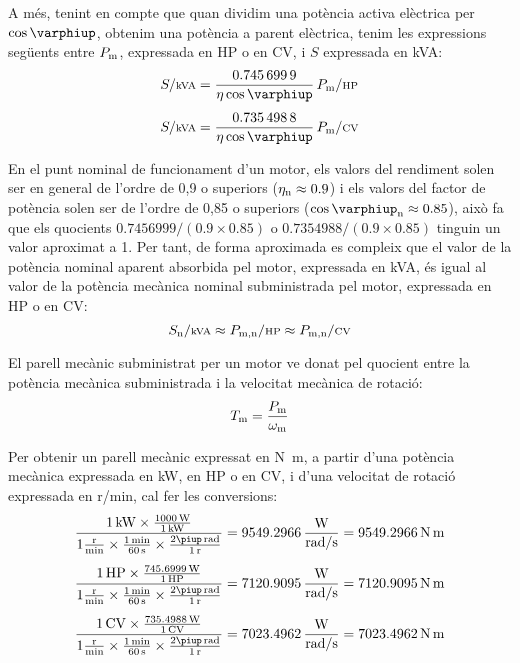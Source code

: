  A més, tenint en compte que quan dividim una potència activa elèctrica per $\cos\varphiup$, obtenim una potència a parent elèctrica, tenim les expressions següents entre $P\ped{m}$, expressada en HP o en CV, i $S$ expressada en kVA:
\begin{align}
    S/{\scriptstyle\si{kVA}} &= \frac{\num{0,7456999}}{\eta \cos\varphiup}\,   P\ped{m}/{\scriptstyle\si{HP}} \\[1ex]
    S/{\scriptstyle\si{kVA}} &= \frac{\num{0,7354988}}{\eta \cos\varphiup}\,   P\ped{m}/{\scriptstyle\si{CV}}
\end{align}

En el punt nominal de funcionament d'un motor, els valors del rendiment solen ser en general de l'ordre de 0,9 o superiors ($\eta\ped{n} \approx \num{0,9}$) i els valors del factor de potència solen ser de l'ordre de 0,85 o superiors ($\cos\varphiup\ped{n} \approx \num{0,85}$), això fa que els quocients $\num{0,7456999}/(\num{0,9} \times \num{0,85})$ o $\num{0,7354988}/(\num{0,9} \times \num{0,85})$ tinguin un valor aproximat a 1. Per tant, de forma aproximada es compleix que el valor de la potència nominal aparent absorbida pel motor, expressada en kVA, és igual al valor de la potència mecànica nominal subministrada pel motor, expressada en HP o en CV:
\begin{equation}\label{eq:kVA-CV-HP}
    S\ped{n}/{\scriptstyle \si{kVA}} \approx  P\ped{m,n}/{\scriptstyle \si{HP}} \approx  P\ped{m,n}/{\scriptstyle \si{CV}}
\end{equation}


El parell mecànic subministrat per un motor ve donat pel quocient entre la potència mecànica subministrada i la velocitat mecànica de rotació:
\begin{equation}\index{parell!mecànic}
    T\ped{m} = \frac{P\ped{m}}{\omega\ped{m}}\label{eq:T-P-w}
\end{equation}

Per  obtenir un  parell mecànic expressat en \si{N.m}, a partir d'una potència mecànica expressada en kW, en HP o en CV, i d'una velocitat de rotació expressada en \si{r/min}, cal  fer les conversions:
\begin{subequations}
\begin{align}
    \frac{\SI{1}{kW} \times \frac{\SI{1000}{W}}{\SI{1}{kW}}}{1\frac{\si{r}}{\si{min}} \times \frac{\SI{1}{min}}{\SI{60}{s}} \times \frac{2\piup\,\si{rad}}{\SI{1}{r}}} &=  \num{9549,2966}\, \frac{\si{W}}{\si{rad/s}} = \SI{9549,2966}{N.m} \\[1ex]
    \frac{\SI{1}{HP} \times \frac{\SI{745,6999}{W}}{\SI{1}{HP}}}{1\frac{\si{r}}{\si{min}} \times \frac{\SI{1}{min}}{\SI{60}{s}} \times \frac{2\piup\,\si{rad}}{\SI{1}{r}}} &=  \num{7120,9095}\, \frac{\si{W}}{\si{rad/s}} = \SI{7120,9095}{N.m} \\[1ex]
    \frac{\SI{1}{CV} \times \frac{\SI{735,4988}{W}}{\SI{1}{CV}}}{1\frac{\si{r}}{\si{min}} \times \frac{\SI{1}{min}}{\SI{60}{s}} \times \frac{2\piup\,\si{rad}}{\SI{1}{r}}} &=  \num{7023,4962}\, \frac{\si{W}}{\si{rad/s}} = \SI{7023,4962}{N.m}
\end{align}
\end{subequations}

